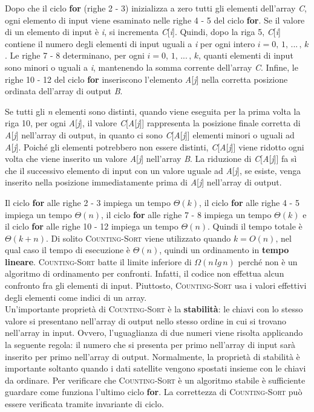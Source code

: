 \documentclass[10pt, a4paper]{report}
\begin{document}
Dopo che il ciclo \textbf{for} (righe 2 - 3) inizializza a zero tutti gli elementi dell'array \textit{C}, ogni elemento di input viene esaminato nelle righe 4 - 5 del ciclo \textbf{for}. Se il valore di un elemento di input è \textit{i}, si incrementa \textit{C}[\textit{i}]. Quindi, dopo la riga 5, \textit{C}[\textit{i}] contiene il numero degli elementi di input uguali a \textit{i} per ogni intero $i = 0,\,1,\,...\,,\,k$. Le righe 7 - 8 determinano, per ogni $i = 0,\,1,\,...\,,\,k$, quanti elementi di input sono minori o uguali a \textit{i}, mantenendo la somma corrente dell'array \textit{C}. Infine, le righe 10 - 12 del ciclo \textbf{for} inseriscono l'elemento \textit{A}[\textit{j}] nella corretta posizione ordinata dell'array di output \textit{B}.

Se tutti gli \textit{n} elementi sono distinti, quando viene eseguita per la prima volta la riga 10, per ogni \textit{A}[\textit{j}], il valore \textit{C}[\textit{A}[\textit{j}]] rappresenta la posizione finale corretta di \textit{A}[\textit{j}] nell'array di output, in quanto ci sono \textit{C}[\textit{A}[\textit{j}]] elementi minori o uguali ad \textit{A}[\textit{j}]. Poiché gli elementi potrebbero non essere distinti, \textit{C}[\textit{A}[\textit{j}]] viene ridotto ogni volta che viene inserito un valore \textit{A}[\textit{j}] nell'array \textit{B}. La riduzione di \textit{C}[\textit{A}[\textit{j}]] fa sì che il successivo elemento di input con un valore uguale ad \textit{A}[\textit{j}], se esiste, venga inserito nella posizione immediatamente prima di \textit{A}[\textit{j}] nell'array di output.

Il ciclo \textbf{for} alle righe 2 - 3 impiega un tempo $\Theta(k)$, il ciclo \textbf{for} alle righe 4 - 5 impiega un tempo $\Theta(n)$, il ciclo \textbf{for} alle righe 7 - 8 impiega un tempo $\Theta(k)$ e il ciclo \textbf{for} alle righe 10 - 12 impiega un tempo $\Theta(n)$. Quindi il tempo totale è $\Theta(k + n)$. Di solito \textsc{Counting-Sort} viene utilizzato quando $k = O(n)$, nel qual caso il tempo di esecuzione è $\Theta(n)$, quindi un ordinamento in \textbf{tempo lineare}. \textsc{Counting-Sort} batte il limite inferiore di $\Omega(n\,lg\,n)$ perché non è un algoritmo di ordinamento per confronti. Infatti, il codice non effettua alcun confronto fra gli elementi di input. Piuttosto, \textsc{Counting-Sort} usa i valori effettivi degli elementi come indici di un array.\\

Un'importante proprietà di \textsc{Counting-Sort} è la \textbf{stabilità}: le chiavi con lo stesso valore si presentano nell'array di output nello stesso ordine in cui si trovano nell'array in input. Ovvero, l'uguaglianza di due numeri viene risolta applicando la seguente regola: il numero che si presenta per primo nell'array di input sarà inserito per primo nell'array di output. Normalmente, la proprietà di stabilità è importante soltanto quando i dati satellite vengono spostati insieme con le chiavi da ordinare. Per verificare che \textsc{Counting-Sort} è un algoritmo stabile è sufficiente guardare come funziona l'ultimo ciclo \textbf{for}. La correttezza di \textsc{Counting-Sort} può essere verificata tramite invariante di ciclo.
\end{document}
